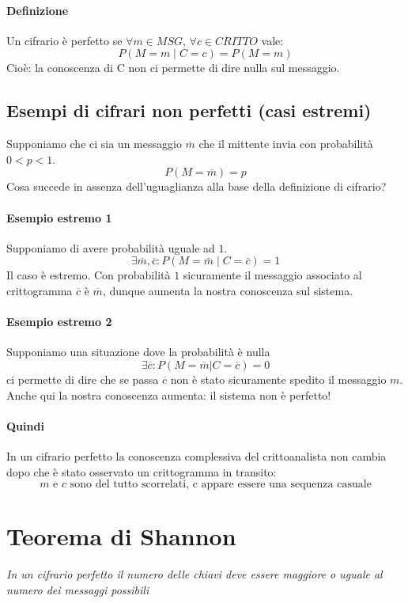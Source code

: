 \paragraph{Definizione} {Un cifrario è perfetto se} $\forall m \in MSG$, $\forall c \in CRITTO$ vale:
$$ P(M=m  \mid  C=c) = P(M=m) $$
Cioè: la conoscenza di C non ci permette di dire nulla sul messaggio.

\subsection{Esempi di cifrari non perfetti (casi estremi)}
Supponiamo che ci sia un messaggio $\overline{m}$ che il mittente invia con probabilità $0<p<1$.
$$P(M=\overline{m}) = p$$
Cosa succede in assenza dell'uguaglianza alla base della definizione di cifrario?
\paragraph{Esempio estremo 1}  Supponiamo di avere probabilità uguale ad $1$.
$$\exists \overline{m}, \overline{c} : P(M=\bar{m} \mid C=\bar{c}) = 1$$
Il caso è estremo. Con probabilità $1$ sicuramente il messaggio associato al crittogramma $\overline{c}$ è $\overline{m}$, dunque aumenta la nostra conoscenza sul sistema. 

\paragraph{Esempio estremo 2} Supponiamo una situazione dove la probabilità è nulla
$$\exists \overline{c} : P(M=\overline{m} | C=\overline{c}) = 0$$
ci permette di dire che se passa $\overline{c}$ non è stato sicuramente spedito il messaggio $m$. Anche qui la nostra conoscenza aumenta: il sistema non è perfetto!

\paragraph{Quindi} In un cifrario perfetto la conoscenza complessiva del crittoanalista non cambia dopo che è stato osservato un crittogramma in transito:
\[\boxed{\text{$m$ e $c$ sono del tutto scorrelati, c appare essere una sequenza casuale}}\]

\section{Teorema di Shannon}
\emph{In un cifrario perfetto il numero delle chiavi deve essere maggiore o uguale al numero dei messaggi possibili}
